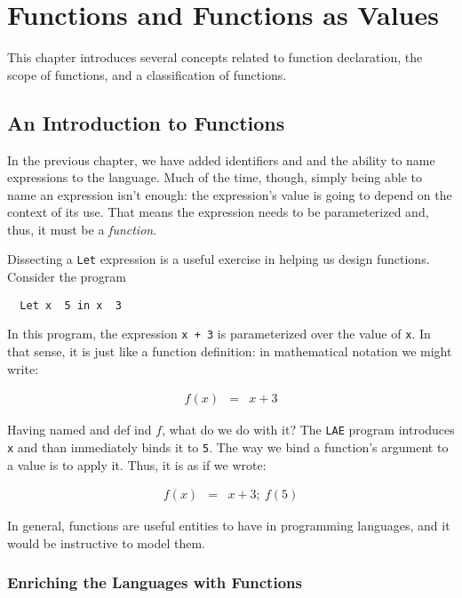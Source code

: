 \documentclass{book}
\renewcommand{\emph}[1]{{\color{blue}\textit{#1}}}
\begin{document}
\chapter{Functions and Functions as Values} 

This chapter introduces several concepts 
related to function declaration, the scope 
of functions, and a classification of 
functions. 

\section{An Introduction to Functions}

In the previous chapter, we have 
added identifiers and and the ability 
to name expressions to the language. 
Much of the time, though, simply 
being able to name an expression isn't 
enough: the expression's value 
is going to depend on the context of 
its use. That means the expression needs 
to be parameterized and, thus, it 
must be a \emph{function}. 

Dissecting a \texttt{Let} expression is 
a useful exercise in helping us design 
functions. Consider the program

\begin{tabbing}\tt
~Let~x~~5~in~x~~3
\end{tabbing}

In this program, the expression \texttt{x + 3} is parameterized 
over the value of \texttt{x}. In that sense, it is just like 
a function definition: in mathematical notation we might 
write: 

\begin{eqnarray*}
f(x) & = & x + 3
\end{eqnarray*}  

Having named and def ind $f$, what do we do with it? The 
\texttt{LAE} program introduces \texttt{x} and than immediately 
binds it to \texttt{5}. The way we bind a function's argument 
to a value is to apply it. Thus, it is as if we wrote: 

\begin{eqnarray*}
f(x) & = & x + 3;\ f(5)
\end{eqnarray*}
 
In general, functions are useful entities to have in programming 
languages, and it would be instructive to model them. 

\subsection{Enriching the Languages with Functions}
\end{document}
